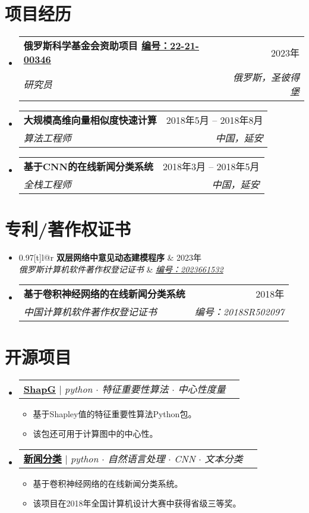 \documentclass[UTF8,10pt]{ctexart}
\makeatletter
\newcommand{\link}[2]{\href{#1}{\color{blue}\underline{#2}}}
\newcommand{\resumeItem}[1]{
  \item\small{
    {#1 \vspace{-2pt}}
  }
}
\newcommand{\resumeSubheading}[4]{
  \vspace{-2pt}\item
  \begin{tabular*}{0.97\textwidth}[t]{l@{\extracolsep{\fill}}r}
    \textbf{#1} & #2 \\
    \textit{\small#3} & \textit{\small #4} \\
  \end{tabular*}\vspace{-7pt}
}
\newcommand{\resumeProjectHeading}[2]{
  \item
  \begin{tabular*}{0.97\textwidth}{l@{\extracolsep{\fill}}r}
    \small#1 & #2 \\
  \end{tabular*}\vspace{-7pt}
}
\newenvironment{resumeSubHeadingList}{\begin{itemize}[leftmargin=0.15in, label={}]}{\end{itemize}}
\newenvironment{resumeItemList}{\begin{itemize}}{\end{itemize}}
\makeatother
\begin{document}
\section{项目经历}
\begin{resumeSubHeadingList}
  \resumeSubheading
    {俄罗斯科学基金会资助项目 \link{https://rscf.ru/en/project/22-21-00346/}{编号：22-21-00346}}{2023年}
       {研究员}{俄罗斯，圣彼得堡} \resumeSubheading {大规模高维向量相似度快速计算}{2018年5月 -- 2018年8月} {算法工程师}{中国，延安}

  \resumeSubheading
    {基于CNN的在线新闻分类系统}{2018年3月 -- 2018年5月}
    {全栈工程师}{中国，延安}

\end{resumeSubHeadingList}

\section{专利/著作权证书}
\begin{resumeSubHeadingList}
  \resumeSubheading
    {双层网络中意见动态建模程序}{2023年}
    {俄罗斯计算机软件著作权登记证书}{{\link{https://new.fips.ru/registers-doc-view/fips_servlet?DB=EVM&DocNumber=2023661532&TypeFile=html}{编号：2023661532}}}

  \resumeSubheading
    {基于卷积神经网络的在线新闻分类系统}{2018年}
    {中国计算机软件著作权登记证书}{编号：2018SR502097}
\end{resumeSubHeadingList}

\section{开源项目}
\begin{resumeSubHeadingList}

  \resumeProjectHeading{
    \link{https://github.com/vectorsss/shapG}{\textbf{ShapG}} $|$
    \emph{python $\cdot$ 特征重要性算法 $\cdot$ 中心性度量}}{}
  \begin{resumeItemList}
    \resumeItem{基于Shapley值的特征重要性算法Python包。}
    \resumeItem{该包还可用于计算图中的中心性。}
  \end{resumeItemList}

  \resumeProjectHeading{
    \link{https://github.com/vectorsss/news_classification}{\textbf{新闻分类}} $|$
    \emph{python $\cdot$ 自然语言处理 $\cdot$ CNN $\cdot$ 文本分类}}{}
  \begin{resumeItemList}
    \resumeItem{基于卷积神经网络的在线新闻分类系统。}
    \resumeItem{该项目在2018年全国计算机设计大赛中获得省级三等奖。}
  \end{resumeItemList}
\end{resumeSubHeadingList}
\end{document}
